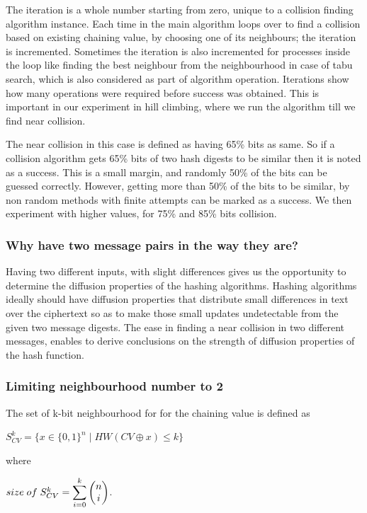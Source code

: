 The iteration is a whole number starting from zero, unique to a collision finding algorithm instance. Each time in
the main algorithm loops over to find a collision based on existing chaining value, by choosing one of its
neighbours; the iteration is incremented. Sometimes the iteration is also incremented for processes inside the
loop like finding the best neighbour from the neighbourhood in case of tabu search, which is also considered as
part of algorithm operation. Iterations show how many operations were required before success was obtained. This
is important in our experiment in hill climbing, where we run the algorithm till we find near collision.

The near collision in this case is defined as having 65\% bits as same. So if a collision algorithm gets 65\% bits
of two hash digests to be similar then it is noted as a success. This is a small margin, and randomly 50\% of the
bits can be guessed correctly. However, getting more than 50\% of the bits to be similar, by non random methods with
finite attempts can be marked as a success. We then experiment with higher values, for 75\% and 85\% bits collision.

\subsubsection{Why have two message pairs in the way they are?}
Having two different inputs, with slight differences gives us the opportunity to determine the diffusion properties
of the hashing algorithms. Hashing algorithms ideally should have diffusion properties that distribute small 
differences in text over the ciphertext so as to make those small updates undetectable from the given two message
digests. The ease in finding a near collision in two different messages, enables to derive conclusions on the
strength of diffusion properties of the hash function.

\subsubsection{Limiting neighbourhood number to 2}
The set of k-bit neighbourhood for for the chaining value is defined as 
\begin{center}$S^{k}_{CV} = \{ x \in \{0, 1\}^{n} \mid HW( CV \oplus x ) \leq k \}$\end{center}
where
\begin{center}$ size \thickspace of \thickspace S^{k}_{CV} = 
\displaystyle \sum \limits_{i = 0}^{k} \begin{pmatrix} n \\ i \end{pmatrix}$.\end{center}

